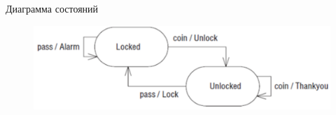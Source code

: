 \documentclass{beamer}
\begin{document}
\begin{frame}[t]{Диаграмма состояний}
\begin{figure}[h]
\centering
\includegraphics[scale=0.45]{images/lec03-pic30.png}
\end{figure}
\end{frame}
\end{document}
